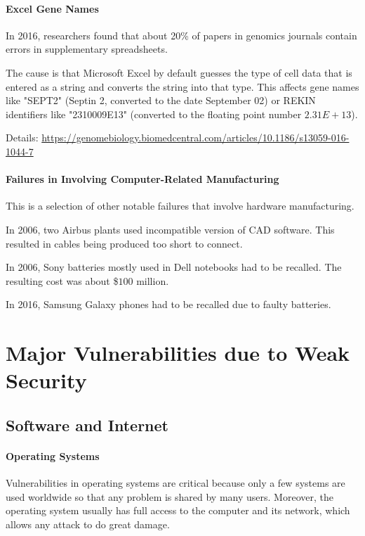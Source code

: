 \paragraph{Excel Gene Names}
In 2016, researchers found that about 20\% of papers in genomics journals contain errors in supplementary spreadsheets.

The cause is that Microsoft Excel by default guesses the type of cell data that is entered as a string and converts the string into that type.
This affects gene names like "SEPT2" (Septin 2, converted to the date September 02) or REKIN identifiers like "2310009E13" (converted to the floating point number $2.31E+13$).

Details: \url{https://genomebiology.biomedcentral.com/articles/10.1186/s13059-016-1044-7}

\paragraph{Failures in Involving Computer-Related Manufacturing}
This is a selection of other notable failures that involve hardware manufacturing.

In 2006, two Airbus plants used incompatible version of CAD software.
This resulted in cables being produced too short to connect.

In 2006, Sony batteries mostly used in Dell notebooks had to be recalled.
The resulting cost was about \$$100$ million.

In 2016, Samsung Galaxy phones had to be recalled due to faulty batteries.

\section{Major Vulnerabilities due to Weak Security}

\subsection{Software and Internet}

\paragraph{Operating Systems}
Vulnerabilities in operating systems are critical because only a few systems are used worldwide so that any problem is shared by many users.
Moreover, the operating system usually has full access to the computer and its network, which allows any attack to do great damage.

